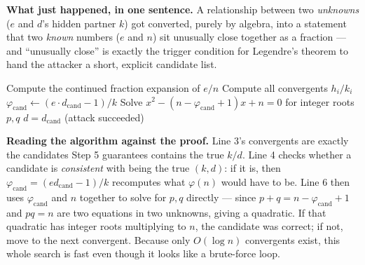 \medskip\noindent\textbf{What just happened, in one sentence.} A relationship between two \emph{unknowns} ($e$ and $d$'s hidden partner $k$) got converted, purely by algebra, into a statement that two \emph{known} numbers ($e$ and $n$) sit unusually close together as a fraction — and ``unusually close'' is exactly the trigger condition for Legendre's theorem to hand the attacker a short, explicit candidate list.

\begin{algorithm}[h]
\caption{Wiener's Attack}
\begin{algorithmic}[1]
\State Compute the continued fraction expansion of $e/n$
\State Compute all convergents $h_i/k_i$
        \State $\varphi_{\text{cand}} \gets (e \cdot d_{\text{cand}} - 1)/k$
        \State Solve $x^2 - (n - \varphi_{\text{cand}} + 1)x + n = 0$ for integer roots $p, q$
         \State \Return $d = d_{\text{cand}}$ (attack succeeded) \EndIf
    \EndIf
\EndFor
\end{algorithmic}
\end{algorithm}

\medskip\noindent\textbf{Reading the algorithm against the proof.} Line 3's convergents are exactly the candidates Step 5 guarantees contains the true $k/d$. Line 4 checks whether a candidate is \emph{consistent} with being the true $(k,d)$: if it is, then $\varphi_{\text{cand}} = (ed_{\text{cand}}-1)/k$ recomputes what $\varphi(n)$ would have to be. Line 6 then uses $\varphi_{\text{cand}}$ and $n$ together to solve for $p,q$ directly — since $p+q = n-\varphi_{\text{cand}}+1$ and $pq=n$ are two equations in two unknowns, giving a quadratic. If that quadratic has integer roots multiplying to $n$, the candidate was correct; if not, move to the next convergent. Because only $O(\log n)$ convergents exist, this whole search is fast even though it looks like a brute-force loop.

